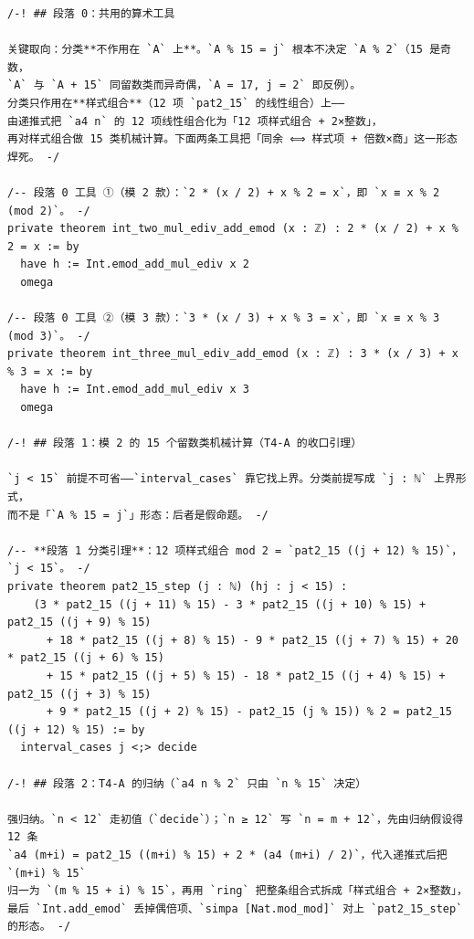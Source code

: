 \documentclass[11pt]{article}
\begin{document}
\begin{lstlisting}[caption={Verbatim excerpt of the proof, \texttt{final/04-mod3x4-proved.lean} lines 100--244 (contiguous); full text is 364 lines and ships in the deposit's \texttt{proofs/}. sha256 \texttt{b40c0802}...).},label={lst:proof}]
/-! ## 段落 0：共用的算术工具

关键取向：分类**不作用在 `A` 上**。`A % 15 = j` 根本不决定 `A % 2`（15 是奇数，
`A` 与 `A + 15` 同留数类而异奇偶，`A = 17, j = 2` 即反例）。
分类只作用在**样式组合**（12 项 `pat2_15` 的线性组合）上——
由递推式把 `a4 n` 的 12 项线性组合化为「12 项样式组合 + 2×整数」，
再对样式组合做 15 类机械计算。下面两条工具把「同余 ⟺ 样式项 + 倍数×商」这一形态焊死。 -/

/-- 段落 0 工具 ①（模 2 款）：`2 * (x / 2) + x % 2 = x`，即 `x ≡ x % 2 (mod 2)`。 -/
private theorem int_two_mul_ediv_add_emod (x : ℤ) : 2 * (x / 2) + x % 2 = x := by
  have h := Int.emod_add_mul_ediv x 2
  omega

/-- 段落 0 工具 ②（模 3 款）：`3 * (x / 3) + x % 3 = x`，即 `x ≡ x % 3 (mod 3)`。 -/
private theorem int_three_mul_ediv_add_emod (x : ℤ) : 3 * (x / 3) + x % 3 = x := by
  have h := Int.emod_add_mul_ediv x 3
  omega

/-! ## 段落 1：模 2 的 15 个留数类机械计算（T4-A 的收口引理）

`j < 15` 前提不可省——`interval_cases` 靠它找上界。分类前提写成 `j : ℕ` 上界形式，
而不是「`A % 15 = j`」形态：后者是假命题。 -/

/-- **段落 1 分类引理**：12 项样式组合 mod 2 = `pat2_15 ((j + 12) % 15)`，`j < 15`。 -/
private theorem pat2_15_step (j : ℕ) (hj : j < 15) :
    (3 * pat2_15 ((j + 11) % 15) - 3 * pat2_15 ((j + 10) % 15) + pat2_15 ((j + 9) % 15)
      + 18 * pat2_15 ((j + 8) % 15) - 9 * pat2_15 ((j + 7) % 15) + 20 * pat2_15 ((j + 6) % 15)
      + 15 * pat2_15 ((j + 5) % 15) - 18 * pat2_15 ((j + 4) % 15) + pat2_15 ((j + 3) % 15)
      + 9 * pat2_15 ((j + 2) % 15) - pat2_15 (j % 15)) % 2 = pat2_15 ((j + 12) % 15) := by
  interval_cases j <;> decide

/-! ## 段落 2：T4-A 的归纳（`a4 n % 2` 只由 `n % 15` 决定）

强归纳。`n < 12` 走初值（`decide`）；`n ≥ 12` 写 `n = m + 12`，先由归纳假设得 12 条
`a4 (m+i) = pat2_15 ((m+i) % 15) + 2 * (a4 (m+i) / 2)`，代入递推式后把 `(m+i) % 15`
归一为 `(m % 15 + i) % 15`，再用 `ring` 把整条组合式拆成「样式组合 + 2×整数」，
最后 `Int.add_emod` 丢掉偶倍项、`simpa [Nat.mod_mod]` 对上 `pat2_15_step` 的形态。 -/


\end{lstlisting}
\end{document}
